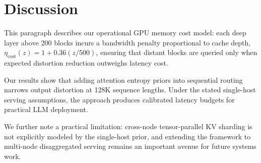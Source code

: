 \documentclass[11pt]{article}
\begin{document}
\section{Discussion}
\label{sec:discussion}

This paragraph describes our operational GPU memory cost model: each deep layer above 200 blocks incurs a bandwidth penalty proportional to cache depth, $\eta_{\text{cost}}(z) = 1 + 0.36 (z / 500)$, ensuring that distant blocks are queried only when expected distortion reduction outweighs latency cost.

Our results show that adding attention entropy priors into sequential routing narrows output distortion at 128K sequence lengths. Under the stated single-host serving assumptions, the approach produces calibrated latency budgets for practical LLM deployment.

We further note a practical limitation: cross-node tensor-parallel KV sharding is not explicitly modeled by the single-host prior, and extending the framework to multi-node disaggregated serving remains an important avenue for future systems work.
\end{document}
